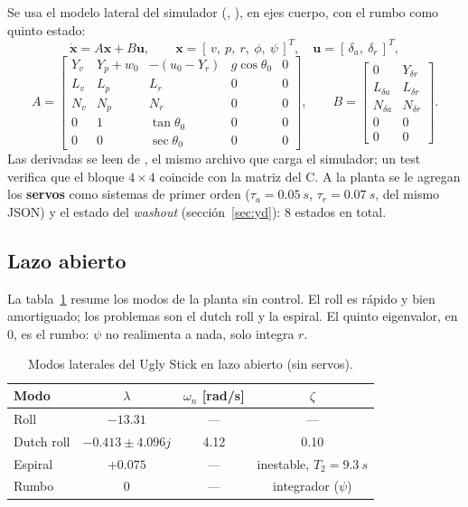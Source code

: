 \documentclass[11pt,a4paper]{article}
\begin{document}
Se usa el modelo lateral del simulador (,
), en ejes cuerpo, con el rumbo como quinto estado:
\begin{equation}
  \dot{\bm x} = A\bm x + B\bm u, \qquad
  \bm x = [\,v,\ p,\ r,\ \phi,\ \psi\,]^T, \quad \bm u = [\,\delta_a,\ \delta_r\,]^T,
\end{equation}
\begin{equation}
A = \begin{bmatrix}
Y_v & Y_p + w_0 & -(u_0 - Y_r) & g\cos\theta_0 & 0\\
L_v & L_p & L_r & 0 & 0\\
N_v & N_p & N_r & 0 & 0\\
0 & 1 & \tan\theta_0 & 0 & 0\\
0 & 0 & \sec\theta_0 & 0 & 0
\end{bmatrix},\qquad
B = \begin{bmatrix}
0 & Y_{\delta r}\\ L_{\delta a} & L_{\delta r}\\ N_{\delta a} & N_{\delta r}\\ 0 & 0\\ 0 & 0
\end{bmatrix}.
\end{equation}
Las derivadas se leen de , el mismo archivo
que carga el simulador; un test verifica que el bloque $4\times4$ coincide con
la matriz del C. A la planta se le agregan los \textbf{servos} como sistemas de
primer orden ($\tau_a = \SI{0.05}{s}$, $\tau_r = \SI{0.07}{s}$, del mismo JSON)
y el estado del \emph{washout} (sección~\ref{sec:yd}): 8 estados en total.

\subsection{Lazo abierto}

La tabla~\ref{tab:la} resume los modos de la planta sin control. El roll es
rápido y bien amortiguado; los problemas son el dutch roll y la espiral. El
quinto eigenvalor, en 0, es el rumbo: $\psi$ no realimenta a nada, solo
integra $r$.

\begin{table}[!htb]
\centering
\caption{Modos laterales del Ugly Stick en lazo abierto (sin servos).}
\label{tab:la}
\begin{tabular}{lccc}
\toprule
Modo & $\lambda$ & $\omega_n$ [\si{rad/s}] & $\zeta$ \\
\midrule
Roll           & $-13.31$            & ---  & --- \\
Dutch roll     & $-0.413 \pm 4.096j$ & 4.12 & 0.10 \\
Espiral        & $+0.075$            & ---  & inestable, $T_2 = \SI{9.3}{s}$ \\
Rumbo          & $0$                 & ---  & integrador ($\psi$) \\
\bottomrule
\end{tabular}
\end{table}
\end{document}
